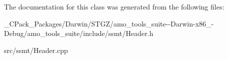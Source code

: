 The documentation for this class was generated from the following files\+:\begin{DoxyCompactItemize}
\item 
\+\_\+\+C\+Pack\+\_\+\+Packages/\+Darwin/\+S\+T\+G\+Z/amo\+\_\+tools\+\_\+suite-\/-\/\+Darwin-\/x86\+\_-\/\+Debug/amo\+\_\+tools\+\_\+suite/include/ssmt/Header.\+h\item 
src/ssmt/Header.\+cpp\end{DoxyCompactItemize}
